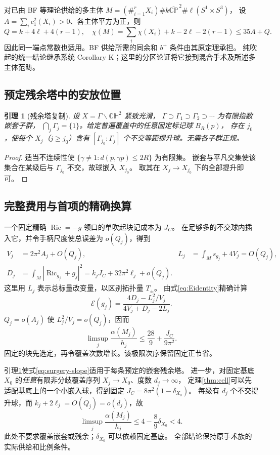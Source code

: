 \documentclass[UTF8,11pt,a4paper,fontset=none]{ctexart}
\numberwithin{equation}{section}
\newtheorem{lemma}[theorem]{引理}
\theoremstyle{definition}
\theoremstyle{remark}\newtheorem{remark}[theorem]{说明}
\newcommand{\Ric}{\operatorname{Ric}}
\newcommand{\CH}{\mathbb{CH}}
\newcommand{\CP}{\mathbb{CP}}
\newcommand{\Ecal}{\mathcal E}
\begin{document}
对已由 BF 等理论供给的多主体
$M=(\#_{i=1}^rX_i)\#k\overline{\CP}^{\,2}\#\ell(S^1\times S^3)$，
设 $A=\sum_i c_1^2(X_i)>0$、各主体平方为正，则
\[
Q=k+4\ell+4(r-1),\quad
\chi(M)=\sum_i\chi(X_i)+k-2\ell-2(r-1)\le35A+Q.
\]
因此同一端点常数也适用。BF 供给所需的同余和 $b^+$ 条件由其原定理承担\cite{BF}。
纯吹起的统一结论继承系统 Corollary K；这里的分区论证将它接到混合手术及所述多主体范畴。

\subsection{预定残余塔中的安放位置}
\begin{lemma}[残余塔复制]\label{lem:tower}
设 $X=\Gamma\backslash\CH^2$ 紧致光滑，
$\Gamma\supset\Gamma_1\supset\Gamma_2\supset\cdots$ 为有限指数嵌套子群，
$\bigcap_j\Gamma_j=\{1\}$。给定普遍覆盖中的任意固定标记球 $B_R(p)$，
存在 $j_0$，使每个 $X_j$（$j\ge j_0$）含有
$[\Gamma_{j_0}:\Gamma_j]$ 个不交等距提升球。无需各子群正规。
\end{lemma}
\begin{proof}
适当不连续性使 $\{\gamma\ne1:d(p,\gamma p)\le2R\}$ 为有限集。
嵌套与平凡交集使该集合在某级后与 $\Gamma_{j_0}$ 不交，故球嵌入 $X_{j_0}$。
取其在 $X_j\to X_{j_0}$ 下的全部提升即可。
\end{proof}

\subsection{完整费用与首项的精确换算}
一个固定精确 $\Ric=-g$ 领口的单吹起块记成本为 $J_C$。
在足够多的不交球内插入它，并令手柄尺度使总误差为 $o(Q_j)$，得到
\begin{align*}
V_j&=2\pi^2A_j+O(Q_j),&
L_j&=\int_Ms_{g_j}+4V_j=O(Q_j),\\
D_j&=\int_M|\Ric_{g_j}+g_j|^2
=k_jJ_C+32\pi^2\ell_j+o(Q_j).
\end{align*}
这里用 $L_j$ 表示总标量改变量，以区别拓扑量 $T_\pm$。
由式\eqref{eq:Eidentity}精确计算
\begin{equation}\label{eq:raw-to-relative}
\Ecal(g_j)=\frac{4D_j-L_j^2/V_j}{4V_j+D_j-2L_j}.
\end{equation}
$Q_j=o(A_j)$ 使 $L_j^2/V_j=o(Q_j)$，因而
\begin{equation}\label{eq:surgery-slope}
\limsup_j\frac{\alpha(M_j)}{h_j}
\le\frac{28}{9}+\frac{J_C}{9\pi^2}.
\end{equation}
固定的块先选定，再令覆盖次数增长。该极限次序保留固定正节省。

引理\ref{lem:tower}使式\eqref{eq:surgery-slope}适用于每条预定的嵌套残余塔。
进一步，对固定基底 $X_0$ 的\emph{任意}有限非分歧覆盖序列 $X_j\to X_0$、度数 $d_j\to\infty$，
定理\ref{thm:cell}可以先适配基底上的一个小嵌入球，得到固定 $J_C=8\pi^2(1-\delta_{X_0})$。
每级有 $d_j$ 个不交提升球，而 $k_j+2\ell_j=O(Q_j)=o(d_j)$，故
\begin{equation}\label{eq:all-covers}
\boxed{\limsup_j\frac{\alpha(M_j)}{h_j}
\le4-\frac89\delta_{X_0}<4.}
\end{equation}
此处不要求覆盖嵌套或残余；$\delta_{X_0}$ 可以依赖固定基底。
全部结论保持原手术族的实际供给和比例条件。
\end{document}
